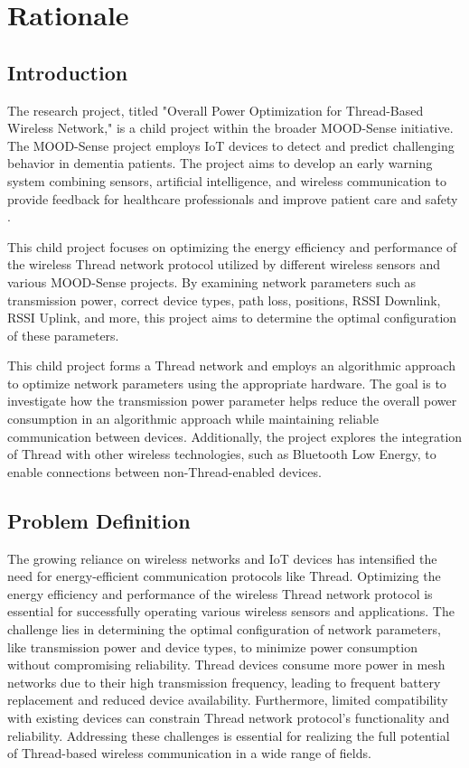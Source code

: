 \chapter{Rationale}\label{chap:rationale}

\section{Introduction}

The research project, titled "Overall Power Optimization for Thread-Based Wireless Network," is a child project within the broader MOOD-Sense initiative. The MOOD-Sense project employs IoT devices to detect and predict challenging behavior in dementia patients. The project aims to develop an early warning system combining sensors, artificial intelligence, and wireless communication to provide feedback for healthcare professionals and improve patient care and safety \cite{MOOD-Sense_Research}.

This child project focuses on optimizing the energy efficiency and performance of the wireless Thread network protocol utilized by different wireless sensors and various MOOD-Sense projects. By examining network parameters such as transmission power, correct device types, path loss, positions, RSSI Downlink, RSSI Uplink, and more, this project aims to determine the optimal configuration of these parameters.

This child project forms a Thread network and employs an algorithmic approach to optimize network parameters using the appropriate hardware. The goal is to investigate how the transmission power parameter helps reduce the overall power consumption in an algorithmic approach while maintaining reliable communication between devices. Additionally, the project explores the integration of Thread with other wireless technologies, such as Bluetooth Low Energy, to enable connections between non-Thread-enabled devices.


\section{Problem Definition}
The growing reliance on wireless networks and IoT devices has intensified the need for energy-efficient communication protocols like Thread. Optimizing the energy efficiency and performance of the wireless Thread network protocol is essential for successfully operating various wireless sensors and applications. The challenge lies in determining the optimal configuration of network parameters, like transmission power and device types, to minimize power consumption without compromising reliability. Thread devices consume more power in mesh networks due to their high transmission frequency, leading to frequent battery replacement and reduced device availability. Furthermore, limited compatibility with existing devices can constrain Thread network protocol's functionality and reliability. Addressing these challenges is essential for realizing the full potential of Thread-based wireless communication in a wide range of fields.


